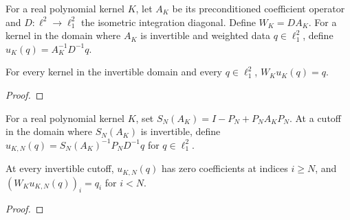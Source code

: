 \begin{supporting}
\begin{definition}
\label{def:volterra-weighted-solution}
\leanok
For a real polynomial kernel $K$, let $A_K$ be its preconditioned coefficient operator and $D:\ell^2\to\ell^2_1$ the isometric integration diagonal. Define $W_K=DA_K$. For a kernel in the domain where $A_K$ is invertible and weighted data $q\in\ell^2_1$, define $u_K(q)=A_K^{-1}D^{-1}q$.
\end{definition}

\begin{theorem}
\label{thm:volterra-weighted-solution}
\leanok
For every kernel in the invertible domain and every $q\in\ell^2_1$, $W_Ku_K(q)=q$.
\end{theorem}
\begin{proof}
\leanok
\end{proof}

\begin{definition}
\label{def:volterra-weighted-finite-solution}
\leanok
For a real polynomial kernel $K$, set $S_N(A_K)=I-P_N+P_NA_KP_N$. At a cutoff in the domain where $S_N(A_K)$ is invertible, define $u_{K,N}(q)=S_N(A_K)^{-1}P_ND^{-1}q$ for $q\in\ell^2_1$.
\end{definition}

\begin{theorem}
\label{thm:volterra-weighted-finite-solution}
\leanok
At every invertible cutoff, $u_{K,N}(q)$ has zero coefficients at indices $i\ge N$, and $(W_Ku_{K,N}(q))_i=q_i$ for $i<N$.
\end{theorem}
\begin{proof}
\leanok
\end{proof}
\end{supporting}



